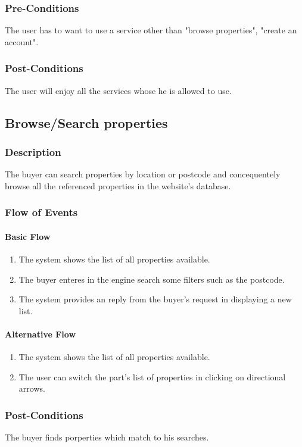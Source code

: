 \documentclass[a4paper,12pt]{article}
\begin{document}
\subsubsection{Pre-Conditions}
The user has to want to use a service other than "browse properties", "create an account".
\subsubsection{Post-Conditions}
The user will enjoy all the services whose he is allowed to use.

\subsection{Browse/Search properties}
\subsubsection{Description}
The buyer can search properties by location or postcode and concequentely browse all the referenced properties in the website's database.
\subsubsection{Flow of Events}
\paragraph{Basic Flow}
\begin{enumerate}
\item The system shows the list of all properties available.
\item The buyer enteres in the engine search some filters such as the postcode.
\item The system provides an reply from the buyer's request in displaying a new list.
\end{enumerate}
\paragraph{Alternative Flow}
\begin{enumerate}
\item The system shows the list of all properties available.
\item The user can switch the part's list of properties in clicking on directional arrows.
\end{enumerate}
\subsubsection{Post-Conditions}
The buyer finds porperties which match to his searches.
\end{document}
